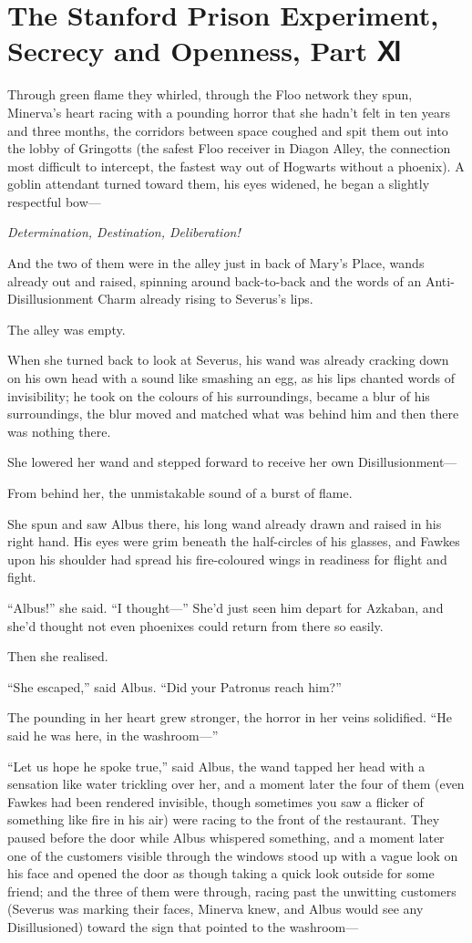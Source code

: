 \section{The Stanford Prison Experiment, Secrecy and Openness, Part Ⅺ}

Through green flame they whirled, through the Floo network they spun,
Minerva's heart racing with a pounding horror that she hadn't felt in
ten years and three months, the corridors between space coughed and spit
them out into the lobby of Gringotts (the safest Floo receiver in Diagon
Alley, the connection most difficult to intercept, the fastest way out
of Hogwarts without a phoenix). A goblin attendant turned toward them,
his eyes widened, he began a slightly respectful bow---

\emph{Determination, Destination, Deliberation!}

And the two of them were in the alley just in back of Mary's Place,
wands already out and raised, spinning around back-to-back and the words
of an Anti-Disillusionment Charm already rising to Severus's lips.

The alley was empty.

When she turned back to look at Severus, his wand was already cracking
down on his own head with a sound like smashing an egg, as his lips
chanted words of invisibility; he took on the colours of his
surroundings, became a blur of his surroundings, the blur moved and
matched what was behind him and then there was nothing there.

She lowered her wand and stepped forward to receive her own
Disillusionment---

From behind her, the unmistakable sound of a burst of flame.

She spun and saw Albus there, his long wand already drawn and raised in
his right hand. His eyes were grim beneath the half-circles of his
glasses, and Fawkes upon his shoulder had spread his fire-coloured wings
in readiness for flight and fight.

``Albus!'' she said. ``I thought---'' She'd just seen him depart for
Azkaban, and she'd thought not even phoenixes could return from there so
easily.

Then she realised.

``She escaped,'' said Albus. ``Did your Patronus reach him?''

The pounding in her heart grew stronger, the horror in her veins
solidified. ``He said he was here, in the washroom---''

``Let us hope he spoke true,'' said Albus, the wand tapped her head with
a sensation like water trickling over her, and a moment later the four
of them (even Fawkes had been rendered invisible, though sometimes you
saw a flicker of something like fire in his air) were racing to the
front of the restaurant. They paused before the door while Albus
whispered something, and a moment later one of the customers visible
through the windows stood up with a vague look on his face and opened
the door as though taking a quick look outside for some friend; and the
three of them were through, racing past the unwitting customers (Severus
was marking their faces, Minerva knew, and Albus would see any
Disillusioned) toward the sign that pointed to the washroom---

